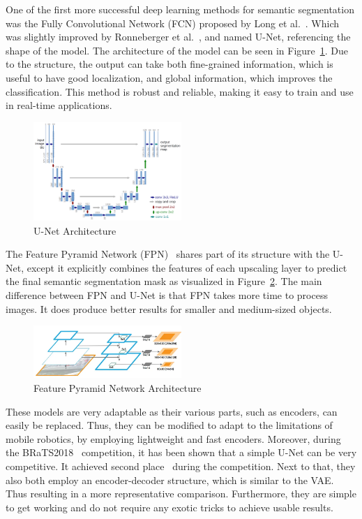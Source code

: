One of the first more successful deep learning methods for semantic segmentation was the Fully Convolutional Network (FCN) proposed by Long et al.~\cite{long2015fully}. Which was slightly improved by Ronneberger et al.~\cite{ronneberger2015u}, and named U-Net, referencing the shape of the model. The architecture of the model can be seen in Figure~\ref{fig:unet-architecture}. Due to the structure, the output can take both fine-grained information, which is useful to have good localization, and global information, which improves the classification. This method is robust and reliable, making it easy to train and use in real-time applications.
\begin{figure}[ht]
    \centering
    \includegraphics[width=0.5\textwidth]{figures/unet-architecture.png}
    \caption{U-Net Architecture~\cite{ronneberger2015u}}
    \label{fig:unet-architecture}
\end{figure}

The Feature Pyramid Network (FPN)~\cite{lin2017feature} shares part of its structure with the U-Net, except it explicitly combines the features of each upscaling layer to predict the final semantic segmentation mask as visualized in Figure~\ref{fig:fpn-architecture}. The main difference between FPN and U-Net is that FPN takes more time to process images. It does produce better results for smaller and medium-sized objects.

\begin{figure}[ht]
    \centering
    \includegraphics[width=0.5\textwidth]{figures/fpn-architecture.png}
    \caption{Feature Pyramid Network Architecture~\cite{lin2017feature}}
    \label{fig:fpn-architecture}
\end{figure}

These models are very adaptable as their various parts, such as encoders, can easily be replaced. Thus, they can be modified to adapt to the limitations of mobile robotics, by employing lightweight and fast encoders. Moreover, during the BRaTS2018~\cite{menze2014multimodal} competition, it has been shown that a simple U-Net can be very competitive. It achieved second place~\cite{DBLP:journals/corr/abs-1809-10483} during the competition. Next to that, they also both employ an encoder-decoder structure, which is similar to the VAE. Thus resulting in a more representative comparison. Furthermore, they are simple to get working and do not require any exotic tricks to achieve usable results.
